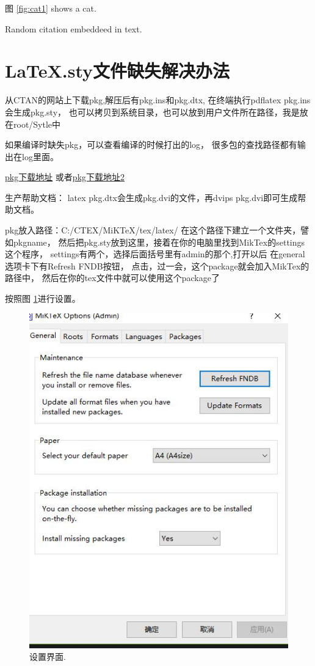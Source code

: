 \documentclass{article}
\begin{document}
  
  图 \ref{fig:cat1} shows a cat.

  Random citation \cite{melissa:1} embeddeed in text.


  \section{LaTeX.sty文件缺失解决办法}
  从CTAN的网站上下载pkg,解压后有pkg.ins和pkg.dtx,
  在终端执行pdflatex pkg.ins会生成pkg.sty，
  也可以拷贝到系统目录，也可以放到用户文件所在路径，我是放在root/Sytle中

  如果编译时缺失pkg，可以查看编译的时候打出的log，
  很多包的查找路径都有输出在log里面。

  
  \href{https://www.ctan.org/pkg}{pkg下载地址}
  或者\href{http://mirrors.cqu.edu.cn/CTAN/macros/latex/contrib/}{pkg下载地址2}

  生产帮助文档：
  latex pkg.dtx会生成pkg.dvi的文件，再dvips pkg.dvi即可生成帮助文档。

  pkg放入路径：C:/CTEX/MiKTeX/tex/latex/
  在这个路径下建立一个文件夹，譬如pkgname，
  然后把pkg.sty放到这里，接着在你的电脑里找到MikTex的settings这个程序，
  settings有两个，选择后面括号里有admin的那个,打开以后
  在general选项卡下有Refresh FNDB按钮，
  点击，过一会，这个package就会加入MikTex的路径中，
  然后在你的tex文件中就可以使用这个package了

  按照图 \ref{fig:set2}进行设置。
  \begin{figure}
    \includegraphics[width=\linewidth]{image/miktex-setting.jpg}
    \caption{设置界面.}
    \label{fig:set2}
  \end{figure}
\end{document}

